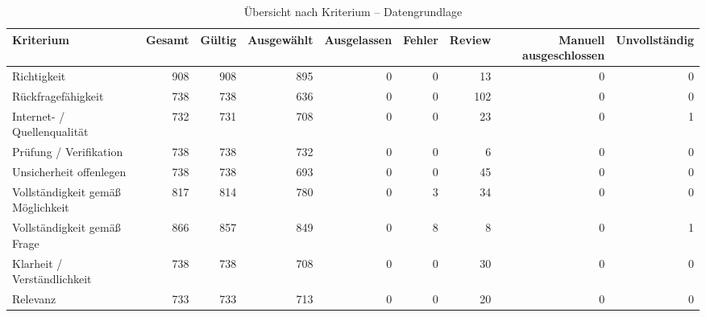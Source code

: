 \begin{table}[htbp]
\centering
\caption{Übersicht nach Kriterium -- Datengrundlage}
\begin{tabular}{lrrrrrrrr}
\toprule
Kriterium & Gesamt & Gültig & Ausgewählt & Ausgelassen & Fehler & Review & Manuell ausgeschlossen & Unvollständig \\
\midrule
Richtigkeit & 908 & 908 & 895 & 0 & 0 & 13 & 0 & 0 \\
Rückfragefähigkeit & 738 & 738 & 636 & 0 & 0 & 102 & 0 & 0 \\
Internet- / Quellenqualität & 732 & 731 & 708 & 0 & 0 & 23 & 0 & 1 \\
Prüfung / Verifikation & 738 & 738 & 732 & 0 & 0 & 6 & 0 & 0 \\
Unsicherheit offenlegen & 738 & 738 & 693 & 0 & 0 & 45 & 0 & 0 \\
Vollständigkeit gemäß Möglichkeit & 817 & 814 & 780 & 0 & 3 & 34 & 0 & 0 \\
Vollständigkeit gemäß Frage & 866 & 857 & 849 & 0 & 8 & 8 & 0 & 1 \\
Klarheit / Verständlichkeit & 738 & 738 & 708 & 0 & 0 & 30 & 0 & 0 \\
Relevanz & 733 & 733 & 713 & 0 & 0 & 20 & 0 & 0 \\
\bottomrule
\end{tabular}
\end{table}
